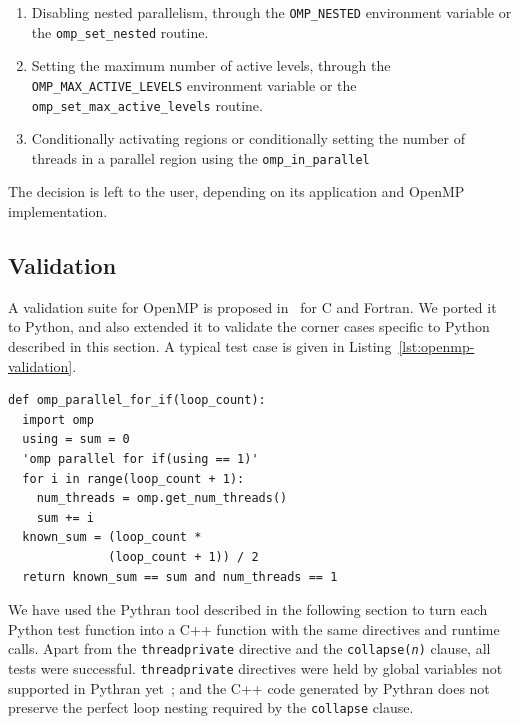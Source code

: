 \documentclass[conference]{IEEEtran}
\begin{document}
\begin{enumerate}

    \item Disabling nested parallelism, through the \texttt{OMP\_NESTED}
        environment variable or the \texttt{omp\_set\_nested} routine.

    \item Setting the maximum number of active levels, through the
        \texttt{OMP\_MAX\_ACTIVE\_LEVELS} environment variable or the
        \texttt{omp\_set\_max\_active\_levels} routine.


    \item Conditionally activating regions or conditionally setting the number
        of threads in a parallel region using the \texttt{omp\_in\_parallel}

\end{enumerate}

The decision is left to the user, depending on its application and OpenMP
implementation.

\subsection{Validation}

A validation suite for OpenMP is proposed in~\cite{wang2012} for C and Fortran.
We ported it to Python, and also extended it to validate the corner cases
specific to Python described in this section. A typical test case is given in
Listing~\ref{lst:openmp-validation}.

\begin{lstlisting}[float,label={lst:openmp-validation},caption={Example of
  Python OpenMP validation test case.}]
def omp_parallel_for_if(loop_count):
  import omp
  using = sum = 0
  'omp parallel for if(using == 1)'
  for i in range(loop_count + 1):
    num_threads = omp.get_num_threads()
    sum += i
  known_sum = (loop_count *
              (loop_count + 1)) / 2
  return known_sum == sum and num_threads == 1
\end{lstlisting}

We have used the Pythran tool described in the following %
 section to turn each
Python test function into a C++ function with the same directives and runtime
calls. Apart from the \texttt{threadprivate} directive and the
\texttt{collapse(\emph{n})} clause, all tests were successful.
\texttt{threadprivate} directives were held by global variables not supported in
Pythran yet~; and the C++ code generated by Pythran does not preserve the
perfect loop nesting required by the \texttt{collapse} clause.
\end{document}
